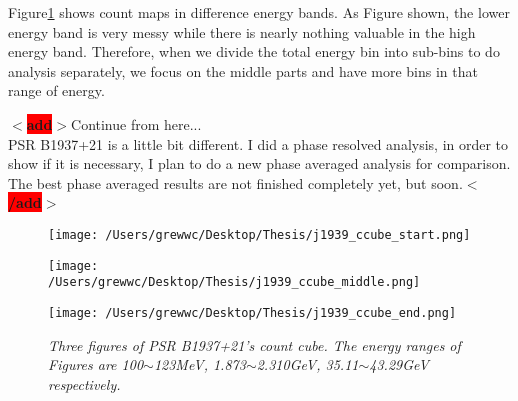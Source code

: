 \documentclass[12pt]{report}
\newcommand{\mycaption}[1]{\caption{\textit{\footnotesize #1}}}
\newcommand{\add}[1]{
  $<$\colorbox{red}{\textbf{add}}$>$#1$<$\colorbox{red}{\textbf{/add}}$>$
}
\begin{document}
          Figure\ref{fig: j1939_count_cube} shows count maps in difference energy bands. As 
          Figure shown, the lower energy band is very messy while there is nearly nothing 
          valuable in the high energy band. Therefore, when we divide the total energy bin into 
          sub-bins to do analysis separately, we focus on the middle parts and have more bins
          in that range of energy.

          \add{Continue from here... \\
            PSR B1937+21 is a little bit different. I did a phase resolved analysis, 
            in order to show if it is necessary, I plan to do a new phase averaged analysis for 
            comparison. The best phase averaged results are not finished completely yet, but soon.}
          \begin{figure}[!ht]
            \begin{minipage}{0.32\textwidth}
              \begin{center} 
                \texttt{[image: /Users/grewwc/Desktop/Thesis/j1939\_ccube\_start.png]}
              \end{center}
            \end{minipage}
            \begin{minipage}{0.32\textwidth}
              \begin{center}
                \texttt{[image: /Users/grewwc/Desktop/Thesis/j1939\_ccube\_middle.png]}
              \end{center}
            \end{minipage}
            \begin{minipage}{0.32\textwidth}
              \begin{center}
              \texttt{[image: /Users/grewwc/Desktop/Thesis/j1939\_ccube\_end.png]}
              \end{center}
            \end{minipage}
            \mycaption{Three figures of PSR B1937+21's count cube. The energy ranges of Figures 
            are 100$\sim$123MeV, 1.873$\sim$2.310GeV, 35.11$\sim$43.29GeV respectively.}
            \label{fig: j1939_count_cube}
          \end{figure}
          \vspace{0.5cm}
\end{document}
